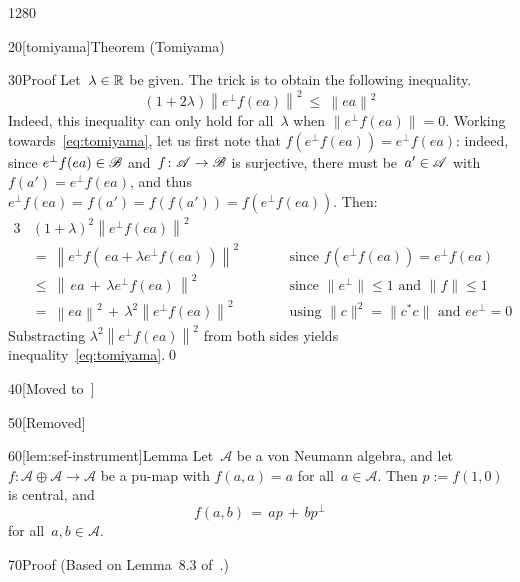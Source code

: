 \begin{parsec}{1280}
\begin{point}{20}[tomiyama]{Theorem (Tomiyama)}
\begin{point}{30}{Proof}
Let~$\lambda \in \mathbb{R}$ be given.
The trick is to obtain the following inequality.
\begin{equation}
\label{eq:tomiyama}
(1+2\lambda) \left\|e^\perp f(ea)\right\|^2 
\ \leq\  \left\|ea\right\|^2
\end{equation}
Indeed, this inequality can only hold for all~$\lambda$
when $\|e^\perp f(ea)\|=0$.
Working towards~\eqref{eq:tomiyama},
let us first note that $f(e^\perp f(ea))=e^\perp f(ea)$:
indeed, since  $e^\perp f(ea)\in \mathscr{B}$
and~$f\colon \mathscr{A}\to\mathscr{B}$ is surjective,
    there must be~$a'\in\mathscr{A}$ with~$f(a')=e^\perp f(ea)$,
    and thus  $e^\perp f(ea)=f(a')=f(f(a'))=f(e^\perp f(ea))$.
Then:
\begin{alignat*}{3}
    &(1+\lambda)^2 \left\|e^\perp f(ea)\right\|^2\\
    &= \ \left\|e^\perp f(\,ea + \lambda e^\perp f(ea)\,)\right\|^2
    \qquad && \text{since }f(e^\perp f(ea))=e^\perp f(ea) \\
    &\leq \ \left\|\,ea\,+\,\lambda e^\perp f(ea)\,\right\|^2\qquad
    &&\text{since }\|e^\perp\|\leq 1\text{ and }\|f\|\leq 1 \\
    &=\ \left\|ea\right\|^2\,+\,\lambda^2 \left\|e^\perp f(ea)\right\|^2
    \qquad&&\text{using $\|c\|^2=\|c^*c\|$ and $ee^\perp=0$}
\end{alignat*}
Substracting $\lambda^2 \left\|e^\perp f(ea)\right\|^2$ from both
sides yields inequality~\eqref{eq:tomiyama}.\qed
\end{point}
\end{point}
\begin{point}{40}{[Moved to~]}%
    \begin{point}{50}{[Removed]}%
\end{point}
\end{point}
\begin{point}{60}[lem:sef-instrument]{Lemma}%
Let~$\mathscr{A}$ be a von Neumann algebra,
and let~$f\colon \mathscr{A}\oplus\mathscr{A}\to \mathscr{A}$
be a pu-map 
with $f(a,a)=a$ for all~$a\in \mathscr{A}$.
Then $p:=f(1,0)$ is central,
and
\begin{equation*}
	f(a,b) \,=\, ap\,+\, bp^\perp
\end{equation*}
for all~$a,b\in\mathscr{A}$.
\begin{point}{70}{Proof}%
(Based on Lemma~8.3 of~\cite{newdirections}.)


\end{point}
\end{point}
\end{parsec}

